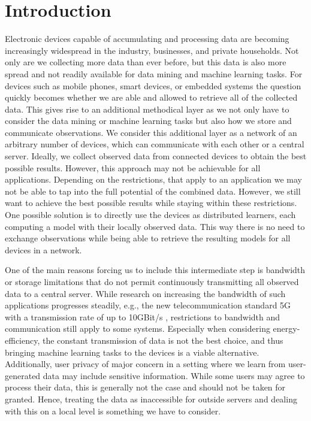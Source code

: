 \chapter{Introduction}
Electronic devices capable of accumulating and processing data are becoming increasingly widespread in the industry, businesses, and private households.
Not only are we collecting more data than ever before, but this data is also more spread and not readily available for data mining and machine learning tasks.
For devices such as mobile phones, smart devices, or embedded systems the question quickly becomes whether we are able and allowed to retrieve all of the collected data.
This gives rise to an additional methodical layer as we not only have to consider the data mining or machine learning tasks but also how we store and communicate observations.
We consider this additional layer as a network of an arbitrary number of devices, which can communicate with each other or a central server.
Ideally, we collect observed data from connected devices to obtain the best possible results.
However, this approach may not be achievable for all applications.
Depending on the restrictions, that apply to an application we may not be able to tap into the full potential of the combined data.
However, we still want to achieve the best possible results while staying within these restrictions.
One possible solution is to directly use the devices as distributed learners, each computing a model with their locally observed data.
This way there is no need to exchange observations while being able to retrieve the resulting models for all devices in a network.

One of the main reasons forcing us to include this intermediate step is bandwidth or storage limitations that do not permit continuously transmitting all observed data to a central server.
While research on increasing the bandwidth of such applications progresses steadily, e.g., the new telecommunication standard 5G with a transmission rate of up to 10GBit/s \cite{nordrum2017ieee}, restrictions to bandwidth and communication still apply to some systems. 
Especially when considering energy-efficiency, the constant transmission of data is not the best choice, and thus bringing machine learning tasks to the devices is a viable alternative.
Additionally, user privacy of major concern in a setting where we learn from user-generated data may include sensitive information.
While some users may agree to process their data, this is generally not the case and should not be taken for granted. 
Hence, treating the data as inaccessible for outside servers and dealing with this on a local level is something we have to consider.

